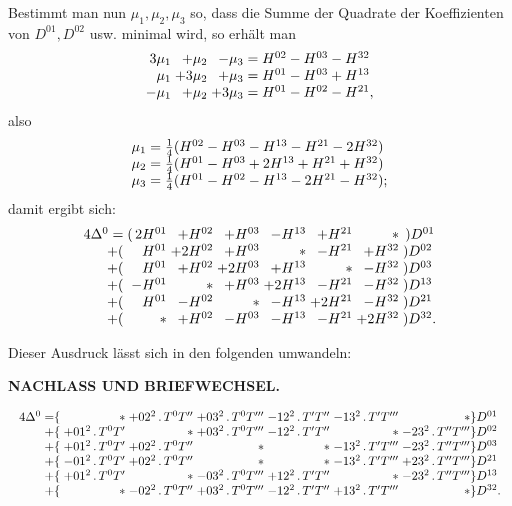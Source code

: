 Bestimmt man nun \(\mu_1,\mu_2,\mu_3\) so, dass die Summe der Quadrate der Koeffizienten von \(D^{01},D^{02}\) usw. minimal wird, so erhält man
\[
\begin{array}{@{}r@{\;}r@{\;}r@{\;=\;}l@{}}
 3\mu_1&+\mu_2&-\mu_3&H^{02}-H^{03}-H^{32}\\
 \mu_1&+3\mu_2&+\mu_3&H^{01}-H^{03}+H^{13}\\
 -\mu_1&+\mu_2&+3\mu_3&H^{01}-H^{02}-H^{21},
\end{array}
\]
\noindent also
\[
\begin{array}{@{}r@{\;=\;}l@{}}
 \mu_1&\tfrac14(H^{02}-H^{03}-H^{13}-H^{21}-2H^{32})\\
 \mu_2&\tfrac14(H^{01}-H^{03}+2H^{13}+H^{21}+H^{32})\\
 \mu_3&\tfrac14(H^{01}-H^{02}-H^{13}-2H^{21}-H^{32});
\end{array}
\]
\noindent damit ergibt sich:
\[
\begin{array}{@{}r@{\;}r@{\;}r@{\;}r@{\;}r@{\;}r@{\;}r@{\;}l@{}}
 4\Delta^0=&(\,2H^{01}&+H^{02}&+H^{03}&-H^{13}&+H^{21}&\ast&\,)D^{01}\\
 +(&H^{01}&+2H^{02}&+H^{03}&\ast&-H^{21}&+H^{32}&)D^{02}\\
 +(&H^{01}&+H^{02}&+2H^{03}&+H^{13}&\ast&-H^{32}&)D^{03}\\
 +(&-H^{01}&\ast&+H^{03}&+2H^{13}&-H^{21}&-H^{32}&)D^{13}\\
 +(&H^{01}&-H^{02}&\ast&-H^{13}&+2H^{21}&-H^{32}&)D^{21}\\
 +(&\ast&+H^{02}&-H^{03}&-H^{13}&-H^{21}&+2H^{32}&)D^{32}.
\end{array}
\]

Dieser Ausdruck lässt sich in den folgenden umwandeln:

\par\clearpage
\noindent{}\hfill{\small\textbf{NACHLASS UND BRIEFWECHSEL.}}\hfill\null\par\medskip

\[
\resizebox{\linewidth}{!}{\(\begin{array}{@{}r@{}r@{\;}r@{\;}r@{\;}r@{\;}r@{\;}r@{\;}r@{}l@{}}
 4\Delta^0=&\{&\ast&+02^2\,.\,T^0T''&+03^2\,.\,T^0T'''&-12^2\,.\,T'T''&-13^2\,.\,T'T'''&\ast&\}D^{01}\\
 +&\{&+01^2\,.\,T^0T'&\ast&+03^2\,.\,T^0T'''&-12^2\,.\,T'T''&\ast&-23^2\,.\,T''T'''&\}D^{02}\\
 +&\{&+01^2\,.\,T^0T'&+02^2\,.\,T^0T''&\ast&\ast&-13^2\,.\,T'T'''&-23^2\,.\,T''T'''&\}D^{03}\\
 +&\{&-01^2\,.\,T^0T'&+02^2\,.\,T^0T''&\ast&\ast&-13^2\,.\,T'T'''&+23^2\,.\,T''T'''&\}D^{21}\\
 +&\{&+01^2\,.\,T^0T'&\ast&-03^2\,.\,T^0T'''&+12^2\,.\,T'T''&\ast&-23^2\,.\,T''T'''&\}D^{13}\\
 +&\{&\ast&-02^2\,.\,T^0T''&+03^2\,.\,T^0T'''&-12^2\,.\,T'T''&+13^2\,.\,T'T'''&\ast&\}D^{32}.
\end{array}\)}
\]


